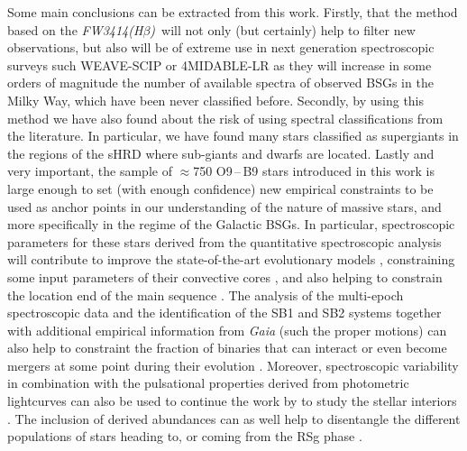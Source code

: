 \documentclass{aa}
\newcommand{\fwhb}{\textit{FW3414(H$\beta$)}}
\begin{document}
Some main conclusions can be extracted from this work. Firstly, that the method based on the \fwhb\ will not only (but certainly) help to filter new observations, but also will be of extreme use in next generation spectroscopic surveys such WEAVE-SCIP \citep{2020SPIE11447E..14D,2023MNRAS.tmp..715J} or 4MIDABLE-LR \citep{2019Msngr.175...30C} as they will increase in some orders of magnitude the number of available spectra of observed BSGs in the Milky Way, which have been never classified before. Secondly, by using this method we have also found about the risk of using spectral classifications from the literature. In particular, we have found many stars classified as supergiants in the regions of the sHRD where sub-giants and dwarfs are located. Lastly and very important, the sample of $\approx$750 O9\,--\,B9 stars introduced in this work is large enough to set (with enough confidence) new empirical constraints to be used as anchor points in our understanding of the nature of massive stars, and more specifically in the regime of the Galactic BSGs.
In particular, spectroscopic parameters for these stars derived from the quantitative spectroscopic analysis will contribute to improve the state-of-the-art evolutionary models \citep[e.g. those from][]{2011A&A...530A.115B,2012A&A...537A.146E}, constraining some input parameters of their convective cores \citep[such the core-overshooting,][]{2019A&A...625A.132S,2021A&A...648A.126M}, and also helping to constrain the location end of the main sequence \citep{2010A&A...512L...7V,2014A&A...570L..13C}. The analysis of the multi-epoch spectroscopic data and the identification of the SB1 and SB2 systems together with additional empirical information from {\em Gaia} (such the proper motions) can also help to constraint the fraction of binaries that can interact or even become mergers at some point during their evolution \citep{2012Sci...337..444S,2014ApJ...782....7D}. Moreover, spectroscopic variability in combination with the pulsational properties derived from photometric lightcurves can also be used to continue the work by \citet{2020A&A...639A..81B} to study the stellar interiors \citep{2013MNRAS.433.1246S,2020svos.conf...53B,2021RvMP...93a5001A}. The inclusion of derived abundances can as well help to disentangle the different populations of stars heading to, or coming from the RSg phase \citep{2021A&A...650A.128G}.
\end{document}
